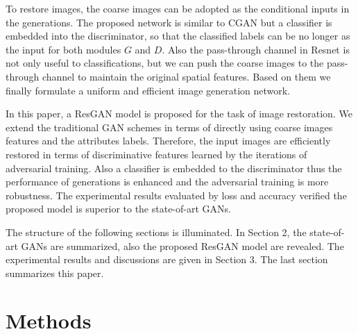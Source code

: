 \documentclass[publish,JACIII,paper]{jaciiiarticle}
\begin{document}
To restore images, the coarse images can be adopted as the conditional inputs in the generations.
The proposed network is similar to CGAN but a classifier is embedded into the discriminator,
so that the classified labels can be no longer as the input for both modules $G$ and $D$.
Also the pass-through channel in Resnet \cite{He2015} is not only useful to classifications, 
but we can push the coarse images to the pass-through channel to maintain the original spatial features.
Based on them we finally formulate a uniform and efficient image generation network.

In this paper, a ResGAN model is proposed for the task of image restoration.
We extend the traditional GAN schemes in terms of directly using coarse images features and the attributes labels. 
Therefore, the input images are efficiently restored in terms of discriminative features learned by the iterations of adversarial training. 
Also a classifier is embedded to the discriminator thus the performance of generations is enhanced and the adversarial training is more robustness.
The experimental results evaluated by loss and accuracy verified the proposed model is superior to the state-of-art GANs.

The structure of the following sections is illuminated.
In Section 2, the state-of-art GANs are summarized,
also the proposed ResGAN model are revealed.
The experimental results and discussions are given in Section 3.
The last section summarizes this paper.

\section{Methods}
\end{document}
